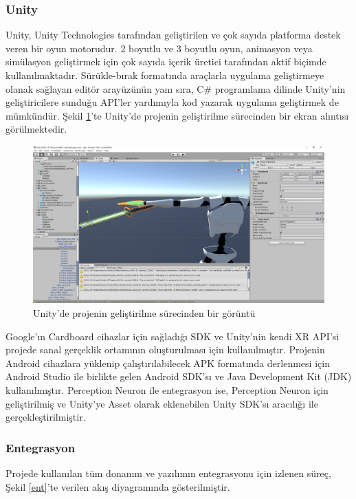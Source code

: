 \documentclass[a4paper, 12pt, titlepage]{article}
\begin{document}
\subsubsection{Unity}
Unity, Unity Technologies tarafından geliştirilen ve çok sayıda platforma destek veren bir oyun
motorudur. 2 boyutlu ve 3 boyutlu oyun, animasyon veya simülasyon geliştirmek için çok sayıda
içerik üretici tarafından aktif biçimde kullanılmaktadır. Sürükle-bırak formatında araçlarla
uygulama geliştirmeye olanak sağlayan editör arayüzünün yanı sıra, C\# programlama dilinde
Unity’nin geliştiricilere sunduğu API’ler yardımıyla kod yazarak uygulama geliştirmek de mümkündür.
\cite{unityg} Şekil \ref{u}'te Unity’de projenin geliştirilme sürecinden bir ekran alıntısı
görülmektedir.

\begin{figure}[ht!]
    \centering
        \includegraphics[width=5.8in]{images/u}
    \caption{Unity'de projenin geliştirilme sürecinden bir görüntü}   
    \label{u}
\end{figure}

Google’ın Cardboard cihazlar için sağladığı SDK ve Unity’nin kendi XR API’si projede sanal
gerçeklik ortamının oluşturulması için kullanılmıştır. Projenin Android cihazlara yüklenip
çalıştırılabilecek APK formatında derlenmesi için Android Studio ile birlikte gelen Android SDK’sı
ve Java Development Kit (JDK) kullanılmıştır. Perception Neuron ile entegrasyon ise, Perception
Neuron için geliştirilmiş ve Unity’ye Asset olarak eklenebilen Unity SDK’sı aracılığı ile
gerçekleştirilmiştir.

\subsubsection{Entegrasyon}
Projede kullanılan tüm donanım ve yazılımın entegrasyonu için izlenen süreç, Şekil \ref{ent}’te
verilen akış diyagramında gösterilmiştir.
\end{document}
